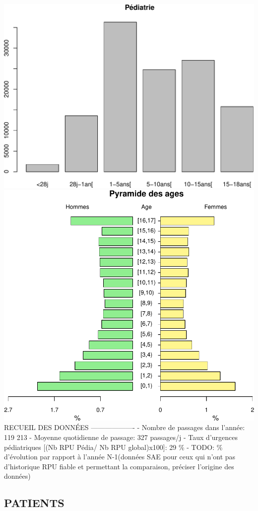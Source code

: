 \documentclass[]{article}
\begin{document}
\includegraphics{rapport2014_V4_files/figure-latex/pop18-1.pdf}
\includegraphics{rapport2014_V4_files/figure-latex/pop18-2.pdf} RECUEIL
DES DONNÉES ------------------- - Nombre de passages dans l'année: 119
213 - Moyenne quotidienne de passage: 327 passages/j - Taux d'urgences
pédiatriques {[}(Nb RPU Pédia/ Nb RPU global)x100{]}: 29 \% - TODO: \%
d'évolution par rapport à l'année N-1(données SAE pour ceux qui n'ont
pas d'historique RPU fiable et permettant la comparaison, préciser
l'origine des données)

\subsection{PATIENTS}\label{patients-1}
\end{document}
